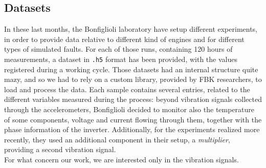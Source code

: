 \documentclass[../main.tex]{subfiles}
\begin{document}
\subsection{Datasets}

In these last months, the Bonfiglioli laboratory have setup different experiments, in order to provide data relative to different kind of engines and for different types of simulated faults. For each of those runs, containing 120 hours of measurements, a dataset in \texttt{.h5} format has been provided, with the values registered during a working cycle. Those datasets had an internal structure quite mazy, and so we had to rely on a custom library, provided by FBK researchers, to load and process the data. Each sample contains several entries, related to the different variables measured during the process: beyond vibration signals collected through the accelerometers, Bonfiglioli decided to monitor also the temperature of some components, voltage and current flowing through them, together with the phase information of the inverter. Additionally, for the experiments realized more recently, they used an additional component in their setup, a \textit{multiplier}, providing a second vibration signal.\\
For what concern our work, we are interested only in the vibration signals.
\end{document}
